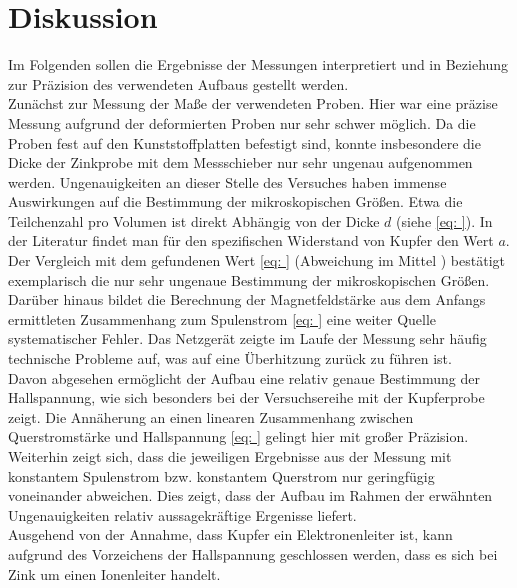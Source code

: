 \section{Diskussion}
Im Folgenden sollen die Ergebnisse der Messungen interpretiert und in Beziehung zur Präzision des verwendeten Aufbaus gestellt werden. \\
Zunächst zur Messung der Maße der verwendeten Proben. Hier war eine präzise Messung aufgrund der deformierten Proben nur sehr schwer möglich.
Da die Proben fest auf den Kunststoffplatten befestigt sind, konnte insbesondere die Dicke der Zinkprobe mit dem Messschieber nur sehr ungenau aufgenommen werden.
Ungenauigkeiten an dieser Stelle des Versuches haben immense Auswirkungen auf die Bestimmung der mikroskopischen Größen. Etwa die Teilchenzahl pro Volumen
ist direkt Abhängig von der Dicke $d$ (siehe \eqref{eq: }). In der Literatur \cite{} findet man für den spezifischen Widerstand von Kupfer den Wert $a$. Der Vergleich %
mit dem gefundenen Wert \eqref{eq: } (Abweichung im Mittel ) bestätigt exemplarisch die nur sehr ungenaue Bestimmung der mikroskopischen Größen.%
Darüber hinaus bildet die Berechnung der Magnetfeldstärke aus dem Anfangs ermittleten Zusammenhang zum Spulenstrom \eqref{eq: } eine weiter Quelle systematischer
Fehler. Das Netzgerät zeigte im Laufe der Messung sehr häufig technische Probleme auf, was auf eine Überhitzung zurück zu führen ist. \\
Davon abgesehen ermöglicht der Aufbau eine relativ genaue Bestimmung der Hallspannung, wie sich besonders bei der Versuchsereihe mit der Kupferprobe zeigt. Die Annäherung
an einen linearen Zusammenhang zwischen Querstromstärke und Hallspannung \eqref{eq: } gelingt hier mit großer Präzision. Weiterhin zeigt sich, dass die jeweiligen
Ergebnisse aus der Messung mit konstantem Spulenstrom bzw. konstantem Querstrom nur geringfügig voneinander abweichen. Dies zeigt, dass der Aufbau im Rahmen der erwähnten
Ungenauigkeiten relativ aussagekräftige Ergenisse liefert.\\
Ausgehend von der Annahme, dass Kupfer ein Elektronenleiter ist,
kann aufgrund des Vorzeichens der Hallspannung geschlossen werden, dass es sich bei Zink um einen Ionenleiter handelt. \\
